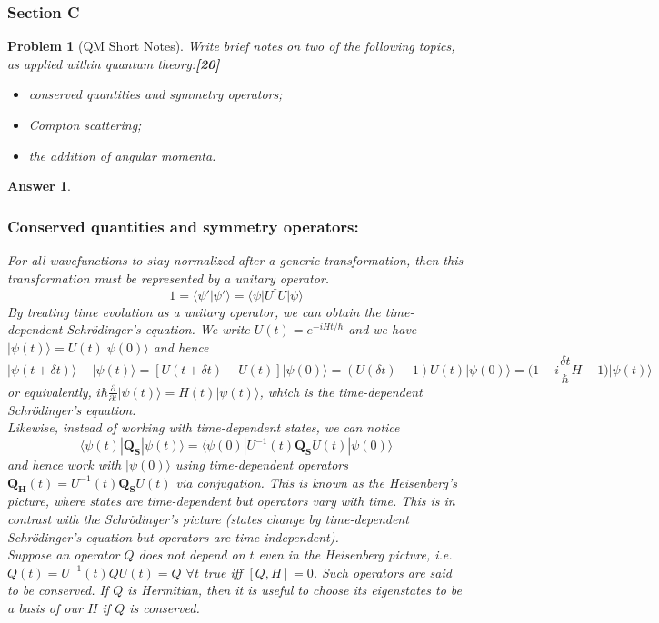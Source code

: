 \documentclass[a4paper]{article}
\newtheorem{ans}{Answer}[subsection]
\theoremstyle{new}
\newtheorem{qns}{Problem}[subsection]
\begin{document}
\subsubsection{Section C}
\begin{qns}[QM Short Notes]
Write brief notes on two of the following topics, as applied within quantum theory:\hfill\textbf{[20]}
\begin{itemize}
    \item conserved quantities and symmetry operators;
    \item Compton scattering;
    \item the addition of angular momenta.
\end{itemize}
\end{qns}
\begin{ans}\leavevmode
\subsubsection*{Conserved quantities and symmetry operators:}
For all wavefunctions to stay normalized after a generic transformation, then this transformation must be represented by a unitary operator.
$$1=\langle\psi'|\psi'\rangle=\langle\psi|U^\dag U|\psi\rangle$$
By treating time evolution as a unitary operator, we can obtain the time-dependent Schr\"{o}dinger's equation.
We write $U(t)=e^{-iHt/\hbar}$ and we have $|\psi(t)\rangle=U(t)|\psi(0)\rangle$ and hence
$$|\psi(t+\delta t)\rangle-|\psi(t)\rangle=[U(t+\delta t)-U(t)]|\psi(0)\rangle=(U(\delta t)-1)U(t)|\psi(0)\rangle=\bigg(1-i\frac{\delta t}{\hbar}H-1\bigg)|\psi(t)\rangle$$
or equivalently, $i\hbar\frac{\partial}{\partial t}|\psi(t)\rangle=H(t)|\psi(t)\rangle$, which is the time-dependent Schr\"{o}dinger's equation.\\[5pt]
Likewise, instead of working with time-dependent states, we can notice $$\langle\psi(t)|\mathbf{Q_S}|\psi(t)\rangle=\langle\psi(0)|U^{-1}(t)\mathbf{Q_S}U(t)|\psi(0)\rangle$$ and hence work with $|\psi(0)\rangle$ using time-dependent operators $\mathbf{Q_H}(t)=U^{-1}(t)\mathbf{Q_S}U(t)$ via conjugation. This is known as the Heisenberg's picture, where states are time-dependent but operators vary with time. This is in contrast with the Schr\"{o}dinger's picture (states change by time-dependent Schr\"{o}dinger's equation but operators are time-independent).\\[5pt]
Suppose an operator $Q$ does not depend on $t$ even in the Heisenberg picture, i.e. $Q(t)=U^{-1}(t)QU(t)=Q$ $\forall t$ true iff $[Q,H]=0$. Such operators are said to be conserved. If $Q$ is Hermitian, then it is useful to choose its eigenstates to be a basis of our $H$ if $Q$ is conserved.\\[5pt]

\end{ans}
\end{document}
